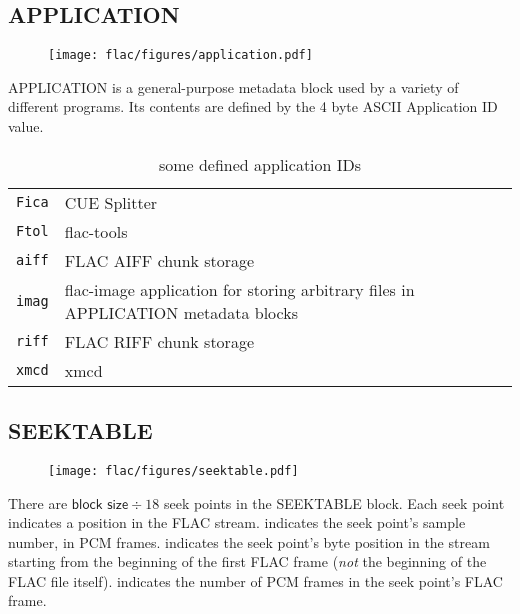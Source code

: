\subsection{APPLICATION}
\begin{figure}[h]
\texttt{[image: flac/figures/application.pdf]}
\end{figure}
\noindent
APPLICATION is a general-purpose metadata block used by a variety of
different programs.
Its contents are defined by the 4 byte ASCII Application ID value.
\begin{table}[h]
{
\begin{tabular}{rl}
\texttt{Fica} & CUE Splitter \\
\texttt{Ftol} & flac-tools \\
\texttt{aiff} & FLAC AIFF chunk storage \\
\texttt{imag} & flac-image application for storing arbitrary files in APPLICATION metadata blocks \\
\texttt{riff} & FLAC RIFF chunk storage \\
\texttt{xmcd} & xmcd \\
\end{tabular}
}
\caption{some defined application IDs}
\end{table}

\clearpage

\subsection{SEEKTABLE}
\begin{figure}[h]
\texttt{[image: flac/figures/seektable.pdf]}
\end{figure}
\par
\noindent
There are $\textsf{block size} \div 18$ seek points in the SEEKTABLE block.
Each seek point indicates a position in the FLAC stream.
 indicates the seek point's sample number, in PCM frames.
 indicates the seek point's
byte position in the stream starting from the beginning
of the first FLAC frame (\textit{not} the beginning of the FLAC file itself).
 indicates the number of PCM frames
in the seek point's FLAC frame.
